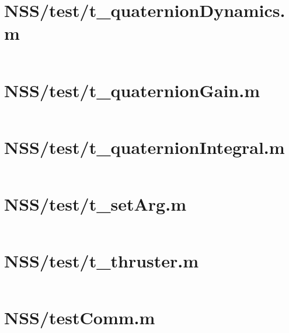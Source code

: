 \pagebreak
\section*{NSS/test/t\_quaternionDynamics.m}\label{code:NSS/test/t_quaternionDynamics.m}
\inputminted[linenos,fontsize=\scriptsize]{matlab}{/home/dcouture/git/mathyourlife/TSatPy/beta_versions/matlab_object_oriented/test/t_quaternionDynamics.m}

\pagebreak
\section*{NSS/test/t\_quaternionGain.m}\label{code:NSS/test/t_quaternionGain.m}
\inputminted[linenos,fontsize=\scriptsize]{matlab}{/home/dcouture/git/mathyourlife/TSatPy/beta_versions/matlab_object_oriented/test/t_quaternionGain.m}

\pagebreak
\section*{NSS/test/t\_quaternionIntegral.m}\label{code:NSS/test/t_quaternionIntegral.m}
\inputminted[linenos,fontsize=\scriptsize]{matlab}{/home/dcouture/git/mathyourlife/TSatPy/beta_versions/matlab_object_oriented/test/t_quaternionIntegral.m}

\pagebreak
\section*{NSS/test/t\_setArg.m}\label{code:NSS/test/t_setArg.m}
\inputminted[linenos,fontsize=\scriptsize]{matlab}{/home/dcouture/git/mathyourlife/TSatPy/beta_versions/matlab_object_oriented/test/t_setArg.m}

\pagebreak
\section*{NSS/test/t\_thruster.m}\label{code:NSS/test/t_thruster.m}
\inputminted[linenos,fontsize=\scriptsize]{matlab}{/home/dcouture/git/mathyourlife/TSatPy/beta_versions/matlab_object_oriented/test/t_thruster.m}

\pagebreak
\section*{NSS/testComm.m}\label{code:NSS/testComm.m}
\inputminted[linenos,fontsize=\scriptsize]{matlab}{/home/dcouture/git/mathyourlife/TSatPy/beta_versions/matlab_object_oriented/testComm.m}

